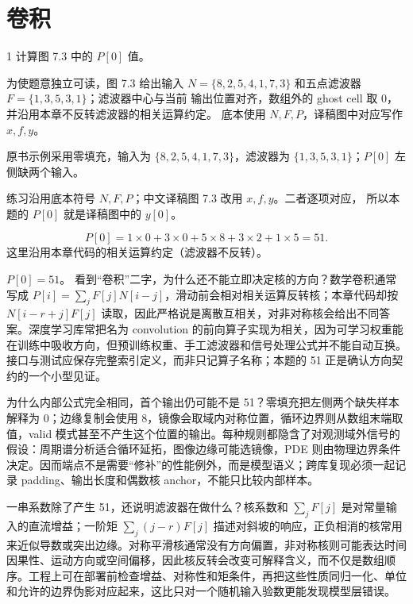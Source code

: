\chapter{卷积}

\begin{solutionexercise}{1}
\problemheading 计算图 7.3 中的 $P[0]$ 值。

为使题意独立可读，图 7.3 给出输入
$N=\{8,2,5,4,1,7,3\}$ 和五点滤波器 $F=\{1,3,5,3,1\}$；滤波器中心与当前
输出位置对齐，数组外的 ghost cell 取 0，并沿用本章不反转滤波器的相关运算约定。
底本使用 $N,F,P$，译稿图中对应写作 $x,f,y$。

\approachheading 原书示例采用零填充，输入为
$\{8,2,5,4,1,7,3\}$，滤波器为 $\{1,3,5,3,1\}$；$P[0]$ 左侧缺两个输入。

\editorialnote 练习沿用底本符号 $N,F,P$；中文译稿图 7.3 改用 $x,f,y$。二者逐项对应，
所以本题的 $P[0]$ 就是译稿图中的 $y[0]$。

\answerheading
\[
P[0]=1\times0+3\times0+5\times8+3\times2+1\times5=51.
\]
这里沿用本章代码的相关运算约定（滤波器不反转）。

\conclusionheading $P[0]=51$。
\discussionheading
{}
看到“卷积”二字，为什么还不能立即决定核的方向？数学卷积通常写成 $P[i]=\sum_j F[j]N[i-j]$，滑动前会相对相关运算反转核；本章代码却按 $N[i-r+j]F[j]$ 读取，因此严格说是离散互相关，对非对称核会给出不同答案。深度学习库常把名为 convolution 的前向算子实现为相关，因为可学习权重能在训练中吸收方向，但预训练权重、手工滤波器和信号处理公式并不能自动互换。接口与测试应保存完整索引定义，而非只记算子名称；本题的 51 正是确认方向契约的一个小型见证。

为什么内部公式完全相同，首个输出仍可能不是 51？零填充把左侧两个缺失样本解释为 0；边缘复制会使用 8，镜像会取域内对称位置，循环边界则从数组末端取值，valid 模式甚至不产生这个位置的输出。每种规则都隐含了对观测域外信号的假设：周期谱分析适合循环延拓，图像边缘可能选镜像，PDE 则由物理边界条件决定。因而端点不是需要“修补”的性能例外，而是模型语义；跨库复现必须一起记录 padding、输出长度和偶数核 anchor，不能只比较内部样本。

一串系数除了产生 51，还说明滤波器在做什么？核系数和 $\sum_jF[j]$ 是对常量输入的直流增益；一阶矩 $\sum_j(j-r)F[j]$ 描述对斜坡的响应，正负相消的核常用来近似导数或突出边缘。对称平滑核通常没有方向偏置，非对称核则可能表达时间因果性、运动方向或空间偏移，因此核反转会改变可解释含义，而不仅是数组顺序。工程上可在部署前检查增益、对称性和矩条件，再把这些性质同归一化、单位和允许的边界伪影对应起来，这比只对一个随机输入验数更能发现模型层错误。


\end{solutionexercise}
